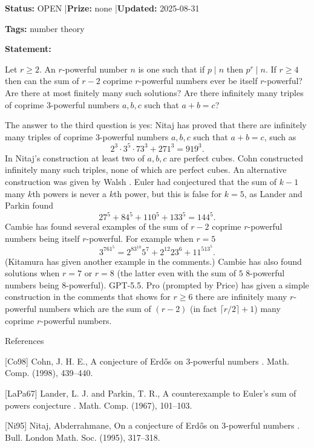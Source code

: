 \documentclass{article}
\begin{document}
\noindent\textbf{Status:} OPEN \quad|\quad \textbf{Prize:} none \quad|\quad \textbf{Updated:} 2025-08-31

\noindent\textbf{Tags:} number theory

\medskip

\noindent\textbf{Statement:}

Let $r\geq 2$. An $r$-powerful number $n$ is one such that if $p\mid n$ then $p^r\mid n$. If $r\geq 4$ then can the sum of $r-2$ coprime $r$-powerful numbers ever be itself $r$-powerful? Are there at most finitely many such solutions? Are there infinitely many triples of coprime $3$-powerful numbers $a,b,c$ such that $a+b=c$?




The answer to the third question is yes: Nitaj \cite{Ni95} has proved that there are infinitely many triples of coprime $3$-powerful numbers $a,b,c$ such that $a+b=c$, such as\[2^3\cdot 3^5\cdot 73^3+271^3 = 919^3.\]In Nitaj's construction at least two of $a,b,c$ are perfect cubes. Cohn \cite{Co98} constructed infinitely many such triples, none of which are perfect cubes. An alternative construction was given by Walsh \cite{Wa24}. Euler had conjectured that the sum of $k-1$ many $k$th powers is never a $k$th power, but this is false for $k=5$, as Lander and Parkin \cite{LaPa67} found\[27^5+84^5+110^5+133^5=144^5.\]Cambie has found several examples of the sum of $r-2$ coprime $r$-powerful numbers being itself $r$-powerful. For example when $r=5$\[3^761^5=2^83^{10}5^7+2^{12}23^6+11^513^5.\](Kitamura has given another example in the comments.) Cambie has also found solutions when $r=7$ or $r=8$ (the latter even with the sum of $5$ $8$-powerful numbers being $8$-powerful). GPT-5.5. Pro (prompted by Price) has given a simple construction in the comments that shows for $r\geq 6$ there are infinitely many $r$-powerful numbers which are the sum of $(r-2)$ (in fact $\lceil r/2\rceil+1$) many coprime $r$-powerful numbers.




References

[Co98] Cohn, J. H. E., A conjecture of {E}rd\H{o}s on {$3$}-powerful numbers . Math. Comp. (1998), 439--440.

[LaPa67] Lander, L. J. and Parkin, T. R., A counterexample to {E}uler's sum of powers conjecture . Math. Comp. (1967), 101--103.

[Ni95] Nitaj, Abderrahmane, On a conjecture of {E}rd\H{o}s on {$3$}-powerful numbers . Bull. London Math. Soc. (1995), 317--318.
\end{document}
